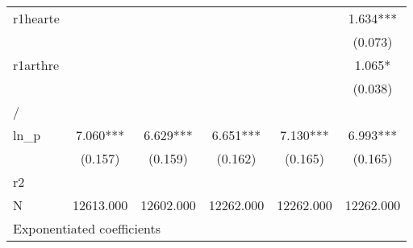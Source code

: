 {\begin{tabular}{l*{5}{c}}
r1hearte        &               &               &               &               &       1.634***\\
                &               &               &               &               &     (0.073)   \\
r1arthre        &               &               &               &               &       1.065*  \\
                &               &               &               &               &     (0.038)   \\
\hline
/               &               &               &               &               &               \\
ln\_p            &       7.060***&       6.629***&       6.651***&       7.130***&       6.993***\\
                &     (0.157)   &     (0.159)   &     (0.162)   &     (0.165)   &     (0.165)   \\
\hline
r2              &               &               &               &               &               \\
N               &   12613.000   &   12602.000   &   12262.000   &   12262.000   &   12262.000   \\
\hline\hline
\multicolumn{6}{l}{\footnotesize Exponentiated coefficients}\\
\end{tabular}
}

